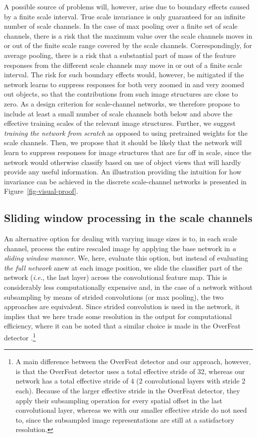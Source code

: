 \documentclass[twocolumn,runningheads]{svjour3}
\begin{document}
A possible source of problems will, however, arise due to boundary
effects caused by a finite scale interval. 
True scale invariance is only guaranteed for an infinite number of scale channels. In the case of max pooling over a finite set of scale channels, there is a risk that the maximum value over the scale channels moves in or out of the finite scale range covered by the scale channels. Correspondingly, for average pooling, there is a risk that a substantial part of
mass of the feature responses from the different
scale channels may move in or out of a finite scale interval.
The risk for such boundary effects would, however, be mitigated if the
network learns to suppress responses for both very zoomed in and
very zoomed out objects, so that the contributions from such image
structures are close to zero. 
As a design criterion for scale-channel networks, we therefore propose
to include at least a small number of scale channels both below
and above the effective training scales of the relevant image
structures. Further, we suggest \emph{training the network from scratch} as opposed to using pretrained weights for the scale channels. Then, we propose
that it should be likely that the network will learn to suppress responses for image structures that are far off in scale, since
the network would otherwise classify based on use of object views that
will hardly provide any useful information. An illustration providing
the intuition for how invariance can be achieved in the discrete
scale-channel networks is presented in Figure~\ref{fig-visual-proof}.

\subsection{Sliding window processing in the scale channels}
\label{sec-sliding-window}

An alternative option for dealing with varying image sizes is to, in
each scale channel, process the entire rescaled image by applying the
base network in {\em a sliding window manner\/}.
We, here, evaluate this option, but instead of evaluating
{\em the full network} anew at each image position,
we slide the classifier part of the network
({\em i.e.\/}, the last layer)
across the convolutional feature map.
This is considerably less computationally expensive and,
in the case of a network without subsampling by means of
strided convolutions (or max pooling),
the two approaches are equivalent.
Since strided convolution is used in the network,
it implies that we here trade some resolution in the
output for computational efficiency,
where it can be noted that a similar choice is made
in the OverFeat detector \cite{SerEigZhaMatFerLeC13-arXiv}.\footnote{A main difference between the OverFeat detector
  \cite{SerEigZhaMatFerLeC13-arXiv}
and our approach, however, is 
that the OverFeat detector uses a total effective stride of 32, 
whereas our network has a total effective stride of 4 (2 convolutional 
layers with stride 2 each). Because of 
the larger effective stride in the OverFeat detector, 
they apply their subsampling operation 
for every spatial offset in the last convolutional layer,
whereas we with our smaller effective stride do not 
need to, since the subsampled image representations are still at a 
satisfactory resolution.}
\end{document}
